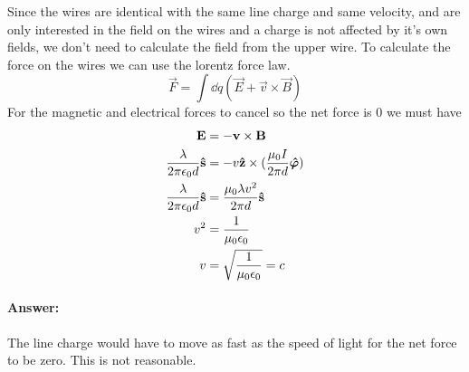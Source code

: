 Since the wires are identical with the same line charge and same velocity, and are only interested in the field on the wires and a charge is not affected by it's own fields, we don't need to calculate the field from the upper wire. To calculate the force on the wires we can use the lorentz force law.
\begin{equation}
    \vec{F} = \int \dd q (\vec{E} + \vec{v} \times \vec{B})
\end{equation}
For the magnetic and electrical forces to cancel so the net force is 0 we must have
\begin{align}
    \bm{\mathrm{E}} &= -\bm{\mathrm{v}} \times \bm{\mathrm{B}}\\
    \frac{\lambda}{2\pi \epsilon_0 d} \bm{\mathrm{\hat{s}}} &= -v \bm{\mathrm{\hat{z}}} \times (\frac{\mu_0 I}{2\pi d} \bm{\mathrm{\hat{\varphi}}})\\
    \frac{\lambda}{2\pi \epsilon_0 d} \bm{\mathrm{\hat{s}}} &= \frac{\mu_0 \lambda v^2}{2\pi d} \bm{\mathrm{\hat{s}}}\\
    v^2 &= \frac{1}{\mu_0 \epsilon_0}\\
    v &= \sqrt{\frac{1}{\mu_0 \epsilon_0}} = c
\end{align}
\paragraph{Answer:} The line charge would have to move as fast as the speed of light for the net force to be zero. This is not reasonable.